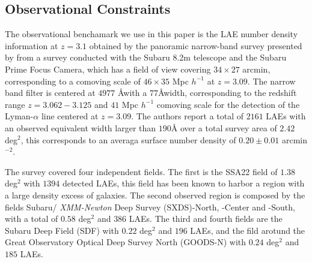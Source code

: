 \documentclass[usenatbib]{mn2e}
\newcommand{\hMsun}{{\ifmmode{h^{-1}{\rm {M_{\odot}}}}\else{$h^{-1}{\rm{M_{\odot}}}$}\fi}}
\begin{document}



\subsection{Observational Constraints}

The observational benchamark we use in this paper is the LAE number
density information at $z=3.1$ obtained by the panoramic narrow-band
survey presented by \cite{Yamada2012} from a survey 
conducted with the Subaru 8.2m telescope and the Subaru Prime
Focus Camera, which has a field of view covering $34\times 27$ arcmin,
corresponding to a comoving scale of $46\times35$ Mpc $h^{-1}$ at
$z=3.09$. The narrow band filter is centered at $4977$ \AA with a
$77$\AA width, corresponding to the redshift range $z=3.062-3.125$ and
$41$ Mpc $h^{-1}$ comoving scale for the detection of the
Lyman-$\alpha$ line centered at $z=3.09$. The authors report a total of
$2161$ LAEs with an observed equivalent width larger than $190$\AA
over a total survey area of $2.42$ deg$^{2}$, this corresponds to an
averaga surface number density of $0.20\pm 0.01$ arcmin$^{-2}$.  

The survey covered four independent fields. The first is the SSA22
field of $1.38$ deg$^2$ with $1394$ detected LAEs, this field has been
known to harbor a region with a large density excess of galaxies. The
second observed region is composed by the fields Subaru/{\it
  XMM-Newton} Deep Survey (SXDS)-North, -Center and -South, with a 
total of $0.58$ deg$^2$ and $386$ LAEs. The third and fourth fields
are the Subaru Deep Field (SDF) with $0.22$ deg$^2$ and $196$ LAEs,
and the fild arotund the Great Observatory Optical Deep Survey North
(GOODS-N) with $0.24$ deg$^2$ and $185$ LAEs. 
\end{document}
